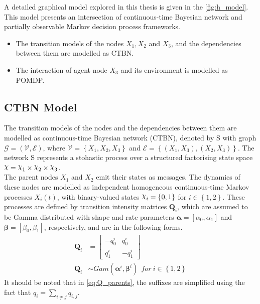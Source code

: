 A detailed graphical model explored in this thesis is given in the \cref{fig:h_model}. This model presents an intersection of continuous-time Bayesian network and partially observable Markov decision process frameworks. 
\begin{itemize}
	\item The transition models of the nodes $ X_1, X_2$ and $ X_3 $, and the dependencies between them are modelled as CTBN.
	\item The interaction of agent node $ X_3 $ and its environment is modelled as POMDP.
\end{itemize}

\subsection{CTBN Model}
\label{sec:exp_ctbn_model}
The transition models of the nodes and the dependencies between them are modelled as continuous-time Bayesian network (CTBN), denoted by S with graph $ \mathcal{G} = \left( \mathcal{V}, \mathcal{E}\right) $, where $ \mathcal{V} = \left\lbrace X_1, X_2, X_3 \right\rbrace $ and $ \mathcal{E} = \left\lbrace (X_1, X_3), (X_2, X_3)\right\rbrace  $. The network S represents a stohastic process over a structured factorising state space $ \rchi = \rchi_1 \times \rchi_2 \times \rchi_3 $.\\
The parent nodes $X_{1}$ and $ X_{2} $ emit their states as messages. The dynamics  of these nodes are modelled as independent homogeneous continuous-time Markov processes $X_{i}(t)$, with binary-valued states $ \rchi_{i} = \left\lbrace 0, 1 \right\rbrace  $ for $ i \in \left\lbrace 1,2 \right\rbrace $. These processes are defined by transition intensity matrices $ \textbf{Q}_{i} $, which are assumed to be Gamma distributed with shape and rate parameters $ \boldsymbol{\alpha} = [\alpha_0, \alpha_1] $ and $ \boldsymbol{\beta} = [\beta_0, \beta_1] $, respectively, and are in the following forms.
\begin{align}
\textbf{Q}_i &= 
\begin{bmatrix}
-q^i_{0} & q^i_{0} \\
q^i_{1} &  -q^i_{1}
\end{bmatrix}
\label{eq:Q_parents}\\
\textbf{Q}_{i} &\sim Gam(\boldsymbol{\alpha}^i, \boldsymbol{\beta}^i)\ \ for\ i \in \left\lbrace 1,2\right\rbrace \label{eq:gamma_priors}
\end{align}
It should be noted that in \autoref{eq:Q_parents}, the suffixes are simplified using the fact that $ q_{i} = \sum_{i \neq j} q_{i,j}$.\\
